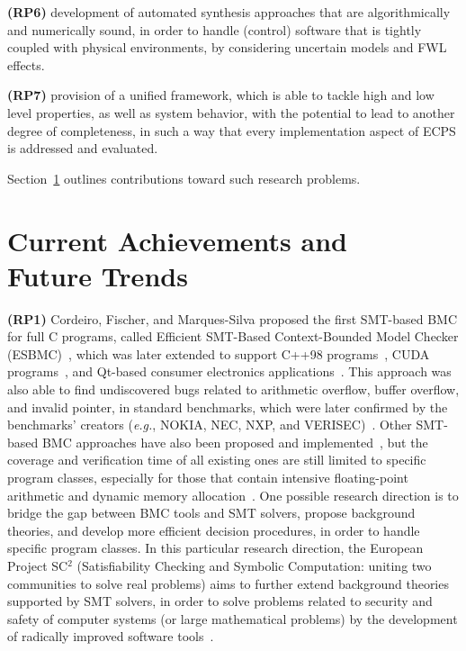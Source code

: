 \documentclass[format=acmsmall, review=false, screen=true]{acmart}
\begin{document}
\textbf{(RP6)} development of automated synthesis approaches that are algorithmically and numerically sound, in order to handle (control) software that is tightly coupled with physical environments, by considering uncertain models and FWL effects.

\textbf{(RP7)} provision of a unified framework, which is able to tackle high and low level properties, as well as system behavior, with the potential to lead to another degree of completeness, in such a way that every implementation aspect of ECPS is addressed and evaluated.


Section~\ref{achievements} outlines contributions toward such research problems.

\section{Current Achievements and \\ Future Trends}
\label{achievements}

\textbf{(RP1)} Cordeiro, Fischer, and Marques-Silva proposed the first SMT-based BMC for full C programs, called Efficient SMT-Based Context-Bounded Model Checker (ESBMC)~\cite{Cordeiro12}, which was later extended to support C++98 programs~\cite{ECBS13}, CUDA programs~\cite{cudalucas,Pereira17}, and Qt-based consumer electronics applications~\cite{Sousa15}. This approach was also able to find undiscovered bugs related to arithmetic overflow, buffer overflow, and invalid pointer, in standard benchmarks, which were later confirmed by the benchmarks' creators ({\it e.g.}, NOKIA, NEC, NXP, and VERISEC)~\cite{CordeiroF11,Cordeiro12}. Other SMT-based BMC approaches have also been proposed and implemented~\cite{MerzFS12}, but the coverage and verification time of all existing ones are still limited to specific program classes, especially for those that contain intensive floating-point arithmetic and dynamic memory allocation~\cite{Beyer14,BeyerSVCOMP15}. One possible research direction is to bridge the gap between BMC tools and SMT solvers, propose background theories, and develop more efficient decision procedures, in order to handle specific program classes. In this particular research direction, the European Project SC$^2$ (Satisfiability Checking and Symbolic Computation: uniting two communities to solve real problems) aims to further extend background theories supported by SMT solvers, in order to solve problems related to security and safety of computer systems (or large mathematical problems) by the development of radically improved software tools~\cite{DBLP:journals/cca/AbrahamA0BBBCDE16}.
\end{document}
